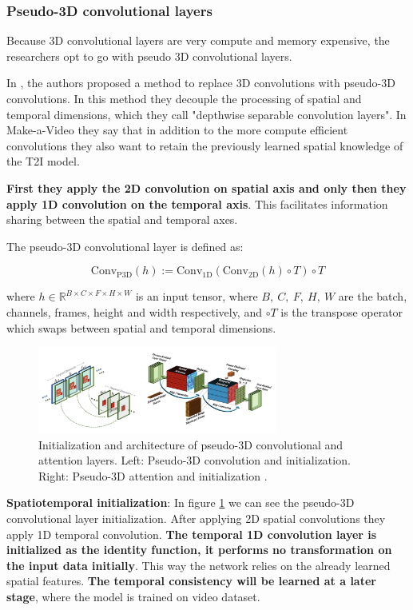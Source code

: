 \subsubsection{Pseudo-3D convolutional layers}

Because 3D convolutional layers are very compute and memory expensive, the researchers opt to go with pseudo 3D convolutional layers.

In \cite{chollet2017xception}, the authors proposed a method to replace 3D convolutions with pseudo-3D convolutions. In this method they decouple the processing of spatial and temporal dimensions, which they call "depthwise separable convolution layers". In Make-a-Video they say that in addition to the more compute efficient convolutions they also want to retain the previously learned spatial knowledge of the T2I model.

\textbf{First they apply the 2D convolution on spatial axis and only then they apply 1D convolution on the temporal axis}. This facilitates information sharing between the spatial and temporal axes.

The pseudo-3D convolutional layer is defined as:

\[ 
\text{Conv}_{\text{P3D}} (h) := \text{Conv}_{\text{1D}} (
    \text{Conv}_{\text{2D}} (h) \circ T
) \circ T \]

where $h \in \mathbb{R}^{B\times C\times F\times H\times W}$ is an input tensor, where $B,\ C,\ F,\ H,\ W$ are the batch, channels, frames, height and width respectively, and $\circ T$ is the transpose operator which swaps between spatial and temporal dimensions.

\begin{figure}
    \centering
    \includegraphics[width=0.7\textwidth]{images/make_a_video/pseudo_3d.png}
    \caption{Initialization and architecture of pseudo-3D convolutional and attention layers. Left: Pseudo-3D convolution and initialization. Right: Pseudo-3D attention and initialization \cite{make_a_video}.}
    \label{fig:make_a_video_pseudo_3d_conv_and_attention}
\end{figure}

\textbf{Spatiotemporal initialization}: In figure \ref{fig:make_a_video_pseudo_3d_conv_and_attention} we can see the pseudo-3D convolutional layer initialization. After applying 2D spatial convolutions they apply 1D temporal convolution. \textbf{The temporal 1D convolution layer is initialized as the identity function, it performs no transformation on the input data initially}. This way the network relies on the already learned spatial features. \textbf{The temporal consistency will be learned at a later stage}, where the model is trained on video dataset.






